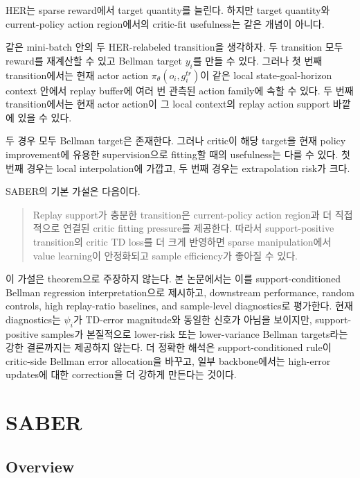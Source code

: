 \documentclass[letterpaper]{article}
\begin{document}
HER는 sparse reward에서 target quantity를 늘린다. 하지만 target quantity와 current-policy action region에서의 critic-fit usefulness는 같은 개념이 아니다.

같은 mini-batch 안의 두 HER-relabeled transition을 생각하자. 두 transition 모두 reward를 재계산할 수 있고 Bellman target \(y_i\)를 만들 수 있다. 그러나 첫 번째 transition에서는 현재 actor action \(\pi_\theta(o_i,g_i^{tr})\)이 같은 local state-goal-horizon context 안에서 replay buffer에 여러 번 관측된 action family에 속할 수 있다. 두 번째 transition에서는 현재 actor action이 그 local context의 replay action support 바깥에 있을 수 있다.

두 경우 모두 Bellman target은 존재한다. 그러나 critic이 해당 target을 현재 policy improvement에 유용한 supervision으로 fitting할 때의 usefulness는 다를 수 있다. 첫 번째 경우는 local interpolation에 가깝고, 두 번째 경우는 extrapolation risk가 크다.

SABER의 기본 가설은 다음이다.
\begin{quote}
Replay support가 충분한 transition은 current-policy action region과 더 직접적으로 연결된 critic fitting pressure를 제공한다. 따라서 support-positive transition의 critic TD loss를 더 크게 반영하면 sparse manipulation에서 value learning이 안정화되고 sample efficiency가 좋아질 수 있다.
\end{quote}

이 가설은 theorem으로 주장하지 않는다. 본 논문에서는 이를 support-conditioned Bellman regression interpretation으로 제시하고, downstream performance, random controls, high replay-ratio baselines, and sample-level diagnostics로 평가한다. 현재 diagnostics는 \(\psi_i\)가 TD-error magnitude와 동일한 신호가 아님을 보이지만, support-positive samples가 본질적으로 lower-risk 또는 lower-variance Bellman targets라는 강한 결론까지는 제공하지 않는다. 더 정확한 해석은 support-conditioned rule이 critic-side Bellman error allocation을 바꾸고, 일부 backbone에서는 high-error updates에 대한 correction을 더 강하게 만든다는 것이다.

\section{SABER}

\subsection{Overview}
\end{document}
